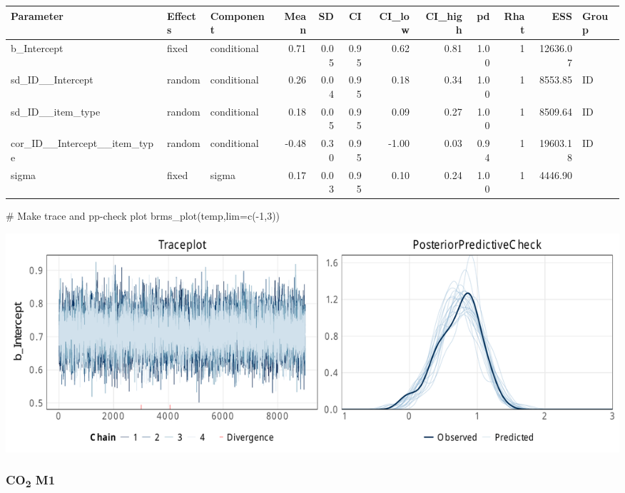 \documentclass[
  letterpaper,
  DIV=11,
  numbers=noendperiod]{scrartcl}
\newenvironment{Shaded}{\begin{snugshade}}{\end{snugshade}}
\newcommand{\AttributeTok}[1]{\textcolor[rgb]{0.40,0.45,0.13}{#1}}
\newcommand{\CommentTok}[1]{\textcolor[rgb]{0.37,0.37,0.37}{#1}}
\newcommand{\DecValTok}[1]{\textcolor[rgb]{0.68,0.00,0.00}{#1}}
\newcommand{\FunctionTok}[1]{\textcolor[rgb]{0.28,0.35,0.67}{#1}}
\newcommand{\NormalTok}[1]{\textcolor[rgb]{0.00,0.23,0.31}{#1}}
\newcommand{\OtherTok}[1]{\textcolor[rgb]{0.00,0.23,0.31}{#1}}
\newcommand{\SpecialCharTok}[1]{\textcolor[rgb]{0.37,0.37,0.37}{#1}}
\newcommand{\StringTok}[1]{\textcolor[rgb]{0.13,0.47,0.30}{#1}}
\begin{document}
\begin{longtable*}[t]{lllrrrrrrrrl}
\toprule
Parameter & Effects & Component & Mean & SD & CI & CI\_low & CI\_high & pd & Rhat & ESS & Group\\
\midrule
b\_Intercept & fixed & conditional & 0.71 & 0.05 & 0.95 & 0.62 & 0.81 & 1.00 & 1 & 12636.07 & \\
sd\_ID\_\_Intercept & random & conditional & 0.26 & 0.04 & 0.95 & 0.18 & 0.34 & 1.00 & 1 & 8553.85 & ID\\
sd\_ID\_\_item\_type & random & conditional & 0.18 & 0.05 & 0.95 & 0.09 & 0.27 & 1.00 & 1 & 8509.64 & ID\\
cor\_ID\_\_Intercept\_\_item\_type & random & conditional & -0.48 & 0.30 & 0.95 & -1.00 & 0.03 & 0.94 & 1 & 19603.18 & ID\\
sigma & fixed & sigma & 0.17 & 0.03 & 0.95 & 0.10 & 0.24 & 1.00 & 1 & 4446.90 & \\
\bottomrule
\end{longtable*}

\begin{Shaded}
\begin{Highlighting}[]
\CommentTok{\# Make trace and pp{-}check plot}
\FunctionTok{brms\_plot}\NormalTok{(temp,}\AttributeTok{lim=}\FunctionTok{c}\NormalTok{(}\SpecialCharTok{{-}}\DecValTok{1}\NormalTok{,}\DecValTok{3}\NormalTok{))}
\end{Highlighting}
\end{Shaded}

\includegraphics{supplement_files/figure-pdf/h2bM0CO2-1.pdf}

\subsubsection{\texorpdfstring{CO\textsubscript{2}
M1}{CO2 M1}}\label{co2-m1-3}

\begin{Shaded}
\end{Shaded}
\end{document}
